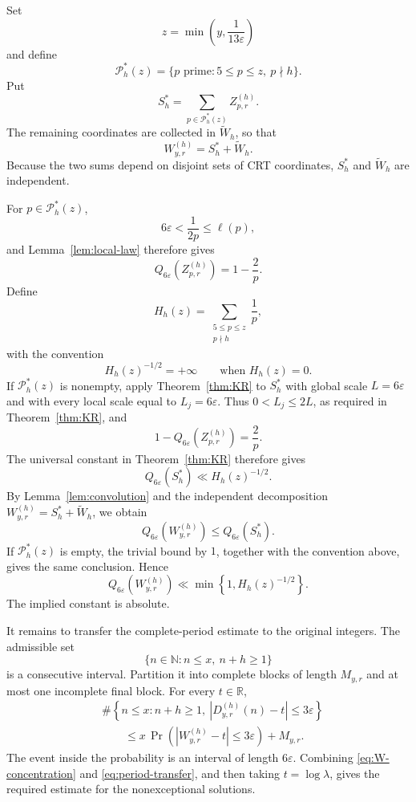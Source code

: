 \documentclass[11pt,reqno]{amsart}
\numberwithin{equation}{section}
\theoremstyle{plain}
\theoremstyle{definition}
\theoremstyle{remark}
\newcommand{\N}{\mathbb N}
\begin{document}
Set
\[
z=\min\left(y,\frac1{13\varepsilon}\right)
\]
and define
\[
\mathcal P_h^\ast(z)=\{p\text{ prime}:5\le p\le z,\ p\nmid h\}.
\]
Put
\[
S_h^\ast=\sum_{p\in\mathcal P_h^\ast(z)}Z^{(h)}_{p,r}.
\]
The remaining coordinates are collected in $\widetilde W_h$, so that
\[
W^{(h)}_{y,r}=S_h^\ast+\widetilde W_h.
\]
Because the two sums depend on disjoint sets of CRT coordinates, $S_h^\ast$ and $\widetilde W_h$ are independent.

For $p\in\mathcal P_h^\ast(z)$,
\[
6\varepsilon<\frac1{2p}\le\ell(p),
\]
and Lemma~\ref{lem:local-law} therefore gives
\[
Q_{6\varepsilon}\!\left(Z^{(h)}_{p,r}\right)=1-\frac2p.
\]
Define
\[
H_h(z)=\sum_{\substack{5\le p\le z\\p\nmid h}}\frac1p,
\]
with the convention
\[
H_h(z)^{-1/2}=+\infty
\qquad\text{when }H_h(z)=0.
\]
If $\mathcal P_h^\ast(z)$ is nonempty, apply Theorem~\ref{thm:KR} to $S_h^\ast$ with global scale $L=6\varepsilon$ and with every local scale equal to $L_j=6\varepsilon$. Thus $0<L_j\le2L$, as required in Theorem~\ref{thm:KR}, and
\[
1-Q_{6\varepsilon}\!\left(Z^{(h)}_{p,r}\right)=\frac2p.
\]
The universal constant in Theorem~\ref{thm:KR} therefore gives
\[
Q_{6\varepsilon}(S_h^\ast)\ll H_h(z)^{-1/2}.
\]
By Lemma~\ref{lem:convolution} and the independent decomposition $W^{(h)}_{y,r}=S_h^\ast+\widetilde W_h$, we obtain
\[
Q_{6\varepsilon}\!\left(W^{(h)}_{y,r}\right)\le Q_{6\varepsilon}(S_h^\ast).
\]
If $\mathcal P_h^\ast(z)$ is empty, the trivial bound by $1$, together with the convention above, gives the same conclusion. Hence
\begin{equation}\label{eq:W-concentration}
Q_{6\varepsilon}\!\left(W^{(h)}_{y,r}\right)
\ll
\min\left\{1,H_h(z)^{-1/2}\right\}.
\end{equation}
The implied constant is absolute.

It remains to transfer the complete-period estimate to the original integers. The admissible set
\[
\{n\in\N:n\le x,\ n+h\ge1\}
\]
is a consecutive interval. Partition it into complete blocks of length $M_{y,r}$ and at most one incomplete final block. For every $t\in\mathbb R$,
\begin{equation}\label{eq:period-transfer}
\begin{aligned}
&\#\left\{n\le x:n+h\ge1,\ \left|D^{(h)}_{y,r}(n)-t\right|\le3\varepsilon\right\}\\
&\qquad\le
x\,\Pr\!\left(\left|W^{(h)}_{y,r}-t\right|\le3\varepsilon\right)+M_{y,r}.
\end{aligned}
\end{equation}
The event inside the probability is an interval of length $6\varepsilon$. Combining \eqref{eq:W-concentration} and \eqref{eq:period-transfer}, and then taking $t=\log\lambda$, gives the required estimate for the nonexceptional solutions.
\end{document}
